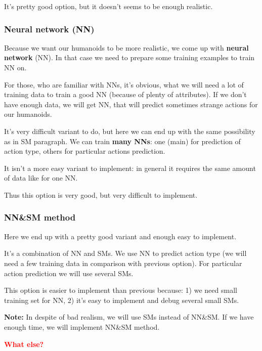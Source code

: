 \documentclass[12pt]{article}
\newcommand{\note}[1]{\textbf{\color{blue}Note:} #1}
\newcommand{\todo}[1]
{
    \marginpar
    {
        \textbf{\small{\textcolor{red}{#1}}}
    }
}
\begin{document}
				It's pretty good option, but it doesn't seems to be enough realistic.

			\subsubsection{Neural network (NN)}
				Because we want our humanoids to be more realistic, we come up with \textbf{neural network} (NN). In that case we need to prepare some training examples to train NN on.

				For those, who are familiar with NNs, it's obvious, what we will need a lot of training data to train a good NN (because of plenty of attributes). If we don't have enough data, we will get NN, that will predict sometimes strange actions for our humanoids.

				It's very difficult variant to do, but here we can end up with the same possibility as in SM paragraph. We can train \textbf{many NNs}: one (main) for prediction of action type, others for particular actions prediction.

				It isn't a more easy variant to implement: in general it requires the same amount of data like for one NN.

				Thus this option is very good, but very difficult to implement.

			\subsubsection{NN\&SM method}
				Here we end up with a pretty good variant and enough easy to implement.

				It's a combination of NN and SMs. We use NN to predict action type (we will need a few training data in comparison with previous option). For particular action prediction we will use several SMs.

				This option is easier to implement than previous because: 1) we need small training set for NN, 2) it's easy to implement and debug several small SMs.

				\note{In despite of bad realism, we will use SMs instead of NN\&SM. If we have enough time, we will implement NN\&SM method.}

		\todo{What else?}
\end{document}
